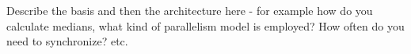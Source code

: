 Describe the basis and then the architecture here - for example how do you calculate medians, what kind of parallelism model is employed? How often do you need to synchronize? etc. 